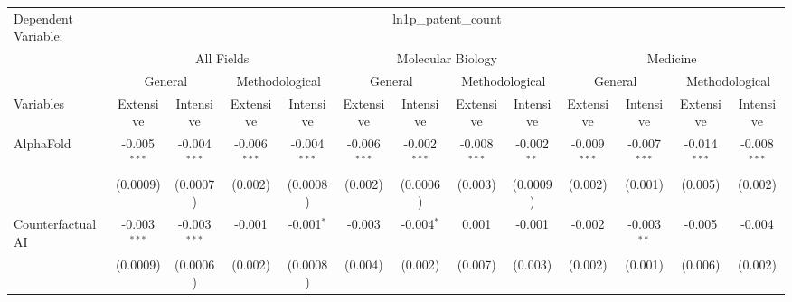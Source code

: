 \begingroup
\centering
\begin{tabular}{lcccccccccccc}
   \tabularnewline \midrule \midrule
   Dependent Variable: & \multicolumn{12}{c}{ln1p\_patent\_count}\\
 & \multicolumn{4}{c}{All Fields} & \multicolumn{4}{c}{Molecular Biology} & \multicolumn{4}{c}{Medicine} \\
\cmidrule(lr){2-5} \cmidrule(lr){6-9} \cmidrule(lr){10-13}
 & \multicolumn{2}{c}{General} & \multicolumn{2}{c}{Methodological} & \multicolumn{2}{c}{General} & \multicolumn{2}{c}{Methodological} & \multicolumn{2}{c}{General} & \multicolumn{2}{c}{Methodological} \\
\cmidrule(lr){2-3} \cmidrule(lr){4-5} \cmidrule(lr){6-7} \cmidrule(lr){8-9} \cmidrule(lr){10-11} \cmidrule(lr){12-13}
Variables & \multicolumn{1}{c}{Extensive} & \multicolumn{1}{c}{Intensive} & \multicolumn{1}{c}{Extensive} & \multicolumn{1}{c}{Intensive} & \multicolumn{1}{c}{Extensive} & \multicolumn{1}{c}{Intensive} & \multicolumn{1}{c}{Extensive} & \multicolumn{1}{c}{Intensive} & \multicolumn{1}{c}{Extensive} & \multicolumn{1}{c}{Intensive} & \multicolumn{1}{c}{Extensive} & \multicolumn{1}{c}{Intensive} \\
\cmidrule(lr){1-1}\cmidrule(lr){2-2} \cmidrule(lr){3-3} \cmidrule(lr){4-4} \cmidrule(lr){5-5} \cmidrule(lr){6-6} \cmidrule(lr){7-7} \cmidrule(lr){8-8} \cmidrule(lr){9-9} \cmidrule(lr){10-10} \cmidrule(lr){11-11} \cmidrule(lr){12-12} \cmidrule(lr){13-13}
   AlphaFold                                & -0.005$^{***}$ & -0.004$^{***}$ & -0.006$^{***}$ & -0.004$^{***}$ & -0.006$^{***}$ & -0.002$^{***}$ & -0.008$^{***}$ & -0.002$^{**}$ & -0.009$^{***}$ & -0.007$^{***}$ & -0.014$^{***}$ & -0.008$^{***}$\\   
                                            & (0.0009)       & (0.0007)       & (0.002)        & (0.0008)       & (0.002)        & (0.0006)       & (0.003)        & (0.0009)      & (0.002)        & (0.001)        & (0.005)        & (0.002)\\   
   Counterfactual AI                        & -0.003$^{***}$ & -0.003$^{***}$ & -0.001         & -0.001$^{*}$   & -0.003         & -0.004$^{*}$   & 0.001          & -0.001        & -0.002         & -0.003$^{**}$  & -0.005         & -0.004\\   
                                            & (0.0009)       & (0.0006)       & (0.002)        & (0.0008)       & (0.004)        & (0.002)        & (0.007)        & (0.003)       & (0.002)        & (0.001)        & (0.006)        & (0.002)\\   

\end{tabular}
